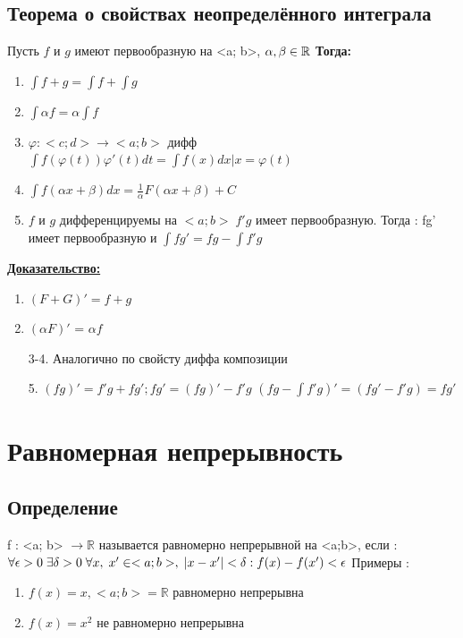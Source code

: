 \documentclass[12pt, a4paper]{article}
\newcommand{\nl}{\newline}
\newcommand{\proof}{\textbf{\underline{Доказательство:}} }
\newcommand{\then}{\textbf{Тогда:}}
\begin{document}
	\subsection{Теорема о свойствах неопределённого интеграла}
	Пусть $f$ и $g$ имеют первообразную на <a; b>, $\alpha , \beta \in \mathbb{R} \newline$
	\then
	\begin{enumerate}
		\item $\int f + g = \int f + \int g $
		\item $\int \alpha f = \alpha  \int f $
		\item $\varphi : <c; d> \rightarrow <a; b>$ дифф \nl
		$\int f(\varphi(t)) \varphi ' (t)dt = \int f(x)dx | x = \varphi(t) $
		\item $\int f(\alpha x + \beta)dx = \frac{1}{\alpha} F (\alpha x + \beta) + C$
		\item $f$ и $g$ дифференцируемы на $<a; b> \; f'g$ имеет первообразную. Тогда : \nl
		fg' имеет первообразную и $\int fg' = fg - \int f'g $
	\end{enumerate}
	\proof
	\begin{enumerate}
		\item $(F + G)' = f + g $
		\item $(\alpha F)'$ = $\alpha f $
		\item[3-4.] Аналогично по свойсту диффа композиции 
		\item[5.] $(fg)' = f'g + fg'; fg' = (fg)' - f'g $ \nl
		$(fg- \int f'g)' = (fg' - f'g) = fg'$
	\end{enumerate}
	
	\section{Равномерная непрерывность}
	\subsection{Определение}
	f : <a; b> $\rightarrow \mathbb{R}$ называется равномерно непрерывной на <a;b>, если : \nl
	$\forall \epsilon >0 \thickspace \exists \delta > 0 \thickspace \forall x, \thickspace x' \in <a;b>, \thickspace |x-x'|<\delta : f(x)-f(x')<\epsilon \nl$
	Примеры :
	\begin{enumerate}
		\item $f(x) = x, <a; b> = \mathbb{R}$ равномерно непрерывна 
		\item $f(x) = x^2$ не равномерно непрерывна 
	\end{enumerate}
	
\end{document}
